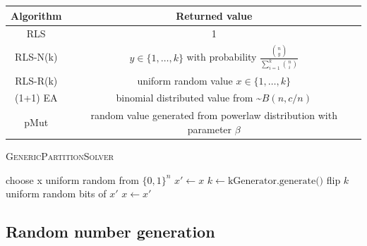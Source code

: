 \begin{tabular}[h]{c c}
      Algorithm & Returned value                                                                          \\
      \hline
      RLS       & 1                                                                                       \\
      RLS-N(k)  & $y \in \{1,\dots,k\}$ with probability $\frac{\binom{n}{y}}{\sum_{i=1}^k \binom{n}{i}}$ \\
      RLS-R(k)  & uniform random value $x \in \{1,\dots,k\}$                                              \\
      (1+1) EA  & binomial distributed value from \textasciitilde$B(n,c/n)$                               \\
      pMut      & random value generated from powerlaw distribution with parameter $\beta$                \\
\end{tabular}



\begin{algorithm}[bt]
      \caption{\textsc{GenericPartitionSolver}}\label{alg:genericPartition}

      \DontPrintSemicolon %

      \BlankLine
      choose x uniform random from ${\{0,1\}}^n$\;
      {
      $x' \leftarrow x$\;
      $k \leftarrow \text{kGenerator.generate()}$\;
      flip $k$ uniform random bits of $x'$\;
      {
      {
            $x \leftarrow x'$\;
      }
      }
      }
\end{algorithm}

\subsection{Random number generation}

